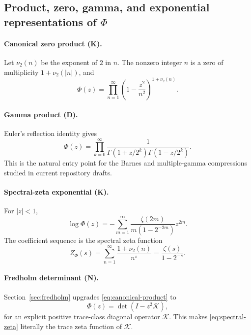 \documentclass[11pt]{article}
\theoremstyle{definition}
\theoremstyle{remark}
\newcommand{\cK}{\mathcal K}
\newcommand{\statusknown}{\textsf{K}}
\newcommand{\statusderived}{\textsf{D}}
\newcommand{\statusnew}{\textsf{N}}
\begin{document}
\subsection{Product, zero, gamma, and exponential representations of \(\Phi\)}

\paragraph{Canonical zero product (\statusknown).}
Let \(\nu_2(n)\) be the exponent of \(2\) in \(n\).  The nonzero integer \(n\) is a zero of
multiplicity \(1+\nu_2(|n|)\), and
\begin{equation}
 \Phi(z)=\prod_{n=1}^{\infty}
 \left(1-\frac{z^2}{n^2}\right)^{1+\nu_2(n)}.                \label{eq:canonical-product}
\end{equation}

\paragraph{Gamma product (\statusderived).}
Euler's reflection identity gives
\begin{equation}
 \Phi(z)=\prod_{k=0}^{\infty}
 \frac{1}{\Gamma(1+z/2^k)\Gamma(1-z/2^k)}.                  \label{eq:gamma-product}
\end{equation}
This is the natural entry point for the Barnes and multiple-gamma compressions studied in
current repository drafts.

\paragraph{Spectral-zeta exponential (\statusknown).}
For \(|z|<1\),
\begin{equation}
 \log\Phi(z)
 =-\sum_{m=1}^{\infty}
 \frac{\zeta(2m)}{m(1-2^{-2m})}z^{2m}.                       \label{eq:logPhi-zeta}
\end{equation}
The coefficient sequence is the spectral zeta function
\begin{equation}
 Z_{\Phi}(s)=\sum_{n=1}^{\infty}\frac{1+\nu_2(n)}{n^s}
 =\frac{\zeta(s)}{1-2^{-s}}.                                \label{eq:spectral-zeta}
\end{equation}

\paragraph{Fredholm determinant (\statusnew).}
Section~\ref{sec:fredholm} upgrades \eqref{eq:canonical-product} to
\begin{equation}
 \Phi(z)=\det(I-z^2\cK),                                    \label{eq:fredholm-preview}
\end{equation}
for an explicit positive trace-class diagonal operator \(\cK\).  This makes
\eqref{eq:spectral-zeta} literally the trace zeta function of \(\cK\).
\end{document}
